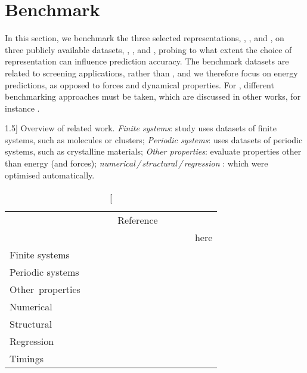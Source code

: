 

\chapter{Benchmark}
\label{ch:repsbench}

In this section, we benchmark the three selected representations, \sfs, \soap, and \mbtr, on three publicly available datasets, \dsgdb, \dsba, and \dstco, probing to what extent the choice of representation can influence prediction accuracy. The benchmark datasets are related to screening applications, rather than \md, and we therefore focus on energy predictions, as opposed to forces and dynamical properties. For \mlps, different benchmarking approaches must be taken, which are discussed in other works, for instance .

\begin{table*}
		\caption[][1.5\baselineskip]{
			Overview of related work.
			\textit{Finite systems}: study uses data\-sets of finite systems, such as molecules or clusters;
			\textit{Periodic systems}: uses data\-sets of periodic systems, such as crystalline materials;
			\textit{Other properties}: evaluate properties other than energy (and forces);
			\textit{numerical\,/\,structural\,/\,regression \hps}: which \hps were optimised automatically.
			\label{tab:repsbench-related}}
		\begin{tabular}[t]{l*{11}c c} \toprule
			& \multicolumn{11}{c}{Reference} \\ \cmidrule(lr){2-12}
			& \cite{fhrl2017q} 
			& \cite{hjrf2020q} 
			& \cite{zcwo2020q} 
			& \cite{sgc2019q}  
			& \cite{nrwh2019q} 
			& \cite{sthr2019q} 
			& \cite{ook2020q} 
			& \cite{kklm2020q} 
			& \cite{pdlg2021q} 
			& \cite{jmhf2018q} 
			& \cite{gfic2021q}
			& here \\ \midrule
			Finite systems    & \yes & \yes & \no   & \yes & \no  & \yes & \yes & \yes & \yes & \yes  & \yes & \yes \\
			Periodic systems  & \no  & \yes & \yes  & \no  & \yes & \no  & \yes & \no  & \no  & \no   & \yes & \yes \\
			Other~properties  & \yes & \yes & \no   & \no  & \no  & \yes & \yes & \yes & \yes & \no   & \yes  & \no  \\
			Numerical \hps     & \no  & \yes & \yes  & \no  & \no  & \yes & \no  & \no  & \no  & \yes  & \no & \yes \\
			Structural \hps    & \no  & \no  & \no   & \no  & \no  & \no  & \no  & \no  & \no  & \no   & \no & \yes \\
			Regression \hps    & \yes & \yes & \yes  & \yes & \yes & \yes & \no  & \yes & \no  & \yes  & \no & \yes \\
			Timings           & \no  & \no  & \yes  & \yes & \no  & \no  & \no  & \no  & \no  & \no   & \no  & \yes \\
			\bottomrule
		\end{tabular}
\end{table*}


